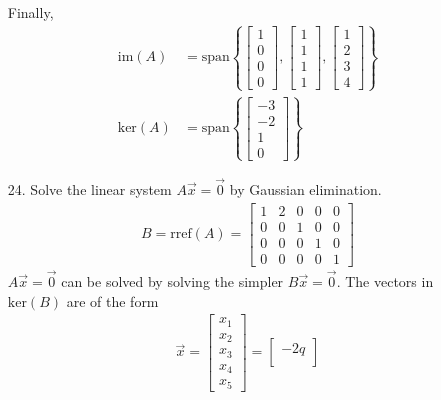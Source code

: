\documentclass[letterpaper,12pt]{article}
\begin{document}
\begin{enumerate}
    Finally,
    \begin{align*}
      \text{im}(A) &= \text{span}\left\{
        \begin{bmatrix}
          1 \\ 0 \\ 0 \\ 0
        \end{bmatrix},
        \begin{bmatrix}
          1 \\ 1 \\ 1 \\ 1
        \end{bmatrix},
        \begin{bmatrix}
          1 \\ 2 \\ 3 \\ 4
        \end{bmatrix}
      \right\} \\
      \text{ker}(A) &= \text{span}\left\{
        \begin{bmatrix}
          -3 \\ -2 \\ 1 \\ 0
        \end{bmatrix}
      \right\}
    \end{align*}
  \item[24.]
    Solve the linear system $A\vec{x} = \vec{0}$ by Gaussian elimination.
    \begin{align*}
      B = \text{rref}(A) = \begin{bmatrix}
        1 & 2 & 0 & 0 & 0 \\
        0 & 0 & 1 & 0 & 0 \\
        0 & 0 & 0 & 1 & 0 \\
        0 & 0 & 0 & 0 & 1
      \end{bmatrix}
    \end{align*}
    $A\vec{x} = \vec{0}$ can be solved by solving the simpler $B\vec{x} = \vec{0}$. The vectors in $\text{ker}(B)$ are of the form
    \begin{align*}
      \vec{x} = \begin{bmatrix}
        x_1 \\ x_2 \\ x_3 \\ x_4 \\ x_5
      \end{bmatrix} = \begin{bmatrix}
        -2q \\

\end{bmatrix}
\end{align*}
\end{enumerate}
\end{document}
